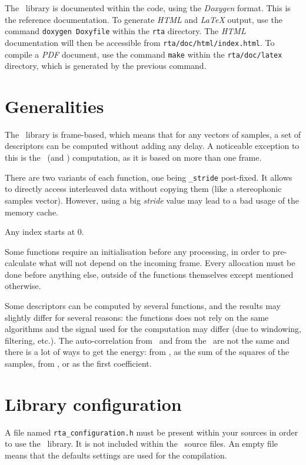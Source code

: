 \documentclass[a4paper, twoside]{article}
\begin{document}
The \rta\ library is documented within the code, using the
\textit{Doxygen} format. This is the reference documentation. To
generate \textit{HTML} and \textit{LaTeX} output, use the command
\texttt{doxygen Doxyfile} within the \texttt{rta} directory.  The
\textit{HTML} documentation will then be accessible from
\texttt{rta/doc/html/index.html}. To compile a \textit{PDF} document,
use the command \texttt{make} within the \texttt{rta/doc/latex}
directory, which is generated by the previous command.

\section{Generalities}
\label{sec:generalities}

The \rta\ library is frame-based, which means that for any vectors of
samples, a set of descriptors can be computed without adding any
delay. A noticeable exception to this is the \del\ (and
\ddel) computation, as it is based on more than one frame.

There are two variants of each function, one being \texttt{\_stride}
post-fixed. It allows to directly access interleaved data without
copying them (like a stereophonic samples vector). However, using a
big \emph{stride} value may lead to a bad usage of the memory cache.

Any index starts at 0.

Some functions require an initialisation before any processing, in
order to pre-calculate what will not depend on the incoming
frame. Every allocation must be done before anything else, outside of
the functions themselves except mentioned otherwise.

Some descriptors can be computed by several functions, and the results
may slightly differ for several reasons: the functions does not rely
on the same algorithms and the signal used for the computation may
differ (due to windowing, filtering, etc.). The auto-correlation from
\yin\ and from the \lpc\ are not the same and there is a
lot of ways to get the energy: from \yin, as the sum of the
squares of the samples, from \lpc, or as the first
\mfcc coefficient.

\section{Library configuration}
\label{sec:configuration}

A file named \texttt{rta\_configuration.h} must be present within your
sources in order to use the \rta\ library. It is not included within
the \rta\ source files. An empty file means that the defaults settings
are used for the compilation.
\end{document}
